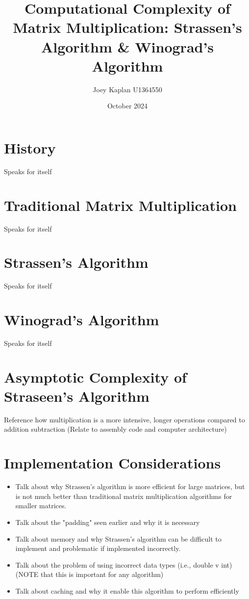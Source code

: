 \documentclass{article}
\title{Computational Complexity of Matrix Multiplication: Strassen’s Algorithm \& Winograd's Algorithm}
\author{Joey Kaplan U1364550}
\date{October 2024}
\begin{document}
\maketitle

\section{History}
    Speaks for itself

\section{Traditional Matrix Multiplication}
    Speaks for itself

\section{Strassen's Algorithm}
    Speaks for itself

\section{Winograd's Algorithm}
    Speaks for itself

\section{Asymptotic Complexity of Straseen's Algorithm}
    Reference how multiplication is a more intensive, longer operations compared to addition subtraction (Relate to assembly code and computer architecture)

\section{Implementation Considerations}
    \begin{itemize}
        \item Talk about why Strassen's algorithm is more efficient for large matrices, but is not much better than traditional matrix multiplication algorithms for smaller matrices.
        \item Talk about the "padding" seen earlier and why it is necessary
        \item Talk about memory and why Strassen's algorithm can be difficult to implement and problematic if implemented incorrectly.
        \item Talk about the problem of using incorrect data types (i.e., double v int) (NOTE that this is important for any algorithm)
        \item Talk about caching and why it enable this algorithm to perform efficiently 
    \end{itemize}
    
\end{document}
